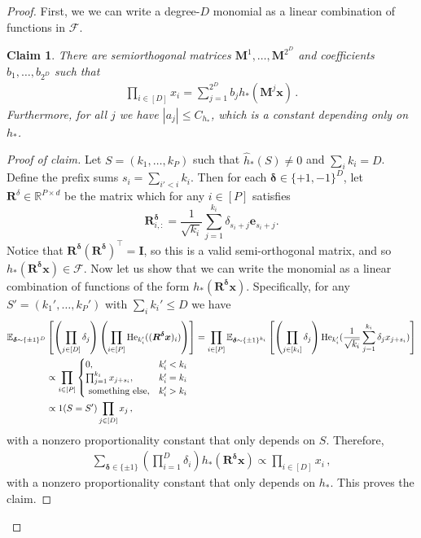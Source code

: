 \documentclass[11pt]{article}
\newcommand{\E}{\mathbb{E}}
\newcommand{\R}{\mathbb{R}}
\newcommand{\<}{\langle}
\renewcommand{\>}{\rangle}
\newtheorem{claim}{Claim}
\theoremstyle{definition}
\def\bI{{\boldsymbol I}}
\def\bM{{\boldsymbol M}}
\def\bR{{\boldsymbol R}}
\def\be{{\boldsymbol e}}
\def\bx{{\boldsymbol x}}
\def\bdelta{{\boldsymbol\delta}}
\def\cF{{\mathcal F}}
\def\He{{\rm He}}
\def\bdelta{{\boldsymbol\delta}}
\def\be{{\boldsymbol e}}
\def\bx{{\boldsymbol x}}
\def\cF{{\mathcal F}}
\def\He{{\rm He}}
\def\be{{\boldsymbol e}}
\def\be{{\boldsymbol e}}
\def\bR{{\boldsymbol R}}
\begin{document}
\begin{proof}
First, we we can write a degree-$D$ monomial as a linear combination of functions in $\cF$.
\begin{claim}
There are semiorthogonal matrices $\bM^1,\ldots,\bM^{2^D}$ and coefficients $b_1,\ldots,b_{2^D}$ such that
\begin{align*}
\prod_{i\in [D]} x_i = \sum_{j=1}^{2^D} b_j h_*(\bM^j \bx)\,.
\end{align*}
Furthermore, for all $j$ we have $|a_j| \leq C_{h_*}$, which is a constant depending only on $h_*$.
\end{claim}
\begin{proof}[Proof of claim]



Let $S = (k_1,\ldots,k_P)$ such that $\hat{h}_*(S) \neq 0$ and $\sum_i k_i = D$. Define the prefix sums $s_i = \sum_{i' < i} k_i$. Then for each $\bdelta \in \{+1,-1\}^D$, let $\bR^{\delta} \in \R^{P \times d}$ be the matrix which for any $i \in [P]$ satisfies 
$$\bR^{\bdelta}_{i,:} = \frac{1}{\sqrt{k_i}}\sum_{j=1}^{k_i} \delta_{s_i + j} \be_{s_i + j}.$$
Notice that $\bR^{\bdelta} (\bR^{\bdelta})^{\top} = \bI$, so this is a valid semi-orthogonal matrix, and so $h_*(\bR^{\bdelta} \bx) \in \cF$. Now let us show that we can write the monomial as a linear combination of functions of the form $h_*(\bR^{\bdelta} \bx)$. Specifically,
for any $S' = (k_1',\ldots,k_P')$ with $\sum_{i} k_i' \leq D$ we have
\begin{align}\label{eq:construct-monomial-gaussian}
\E_{\bdelta \sim \{\pm 1\}^D}&\left[\left(\prod_{j \in [D]} \delta_j\right) \left(\prod_{i \in [P]} \He_{k'_i}((\bR^{\bdelta} \bx)_i)\right)\right] 
= \prod_{i \in [P]} \E_{\bdelta \sim \{\pm 1\}^{k_i}}\left[\left(\prod_{j \in [k_i]} \delta_j\right) \He_{k'_i}(\frac{1}{\sqrt{k_i}}\sum_{j=1}^{k_i} \delta_j x_{j+s_i}) \right] \nonumber \\
&\propto \prod_{i \in [P]} \begin{cases} 0, & 
k_i' < k_i \\
\prod_{j=1}^{k_i} x_{j+s_i}, & k_i' = k_i \\
\mbox{ something else}, & k_i' > k_i\end{cases} \nonumber\\
&\propto 1(S = S') \prod_{j \in [D]} x_j\,,\end{align}
with a nonzero proportionality constant that only depends on $S$. Therefore,
\begin{align*}
\sum_{\bdelta \in \{\pm 1\}} (\prod_{i=1}^D \delta_i) h_*(\bR^{\bdelta} \bx) \propto \prod_{i \in [D]} x_i\,,
\end{align*}
with a nonzero proportionality constant that only depends on $h_*$. This proves the claim.
\end{proof}


\end{proof}
\end{document}
